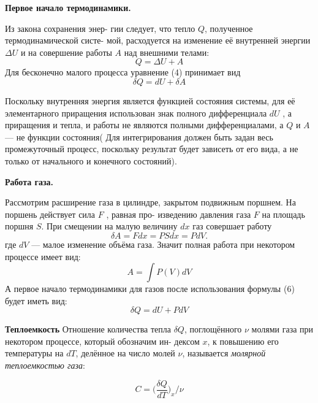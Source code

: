 \documentclass[12pt]{article}
\begin{document}
    \textbf{ Первое начало термодинамики.}

    Из закона сохранения энер- гии следует, что тепло $Q$, полученное термодинамической систе- мой, расходуется на изменение её внутренней энергии $\Delta U$ и на совершение работы $A$ над внешними телами:
    \begin{equation}
        Q = \Delta U + A
    \end{equation}
    Для бесконечно малого процесса уравнение (4) принимает вид 
    \begin{equation}
        \delta Q = dU + \delta A
    \end{equation}

    Поскольку внутренняя энергия является функцией состояния системы, для её элементарного приращения использован знак полного дифференциала $dU$ , а приращения и тепла, и работы не являются полными дифференциалами, а $Q$ и $A$ — не функции состояния(
    Для интегрирования должен быть задан весь промежуточный процесс, поскольку результат будет зависеть от его вида, а не только от начального и конечного состояний).

    \textbf{ Работа газа.}

    Рассмотрим расширение газа в цилиндре, закрытом подвижным поршнем. На поршень действует сила $F$ , равная про- изведению давления газа $F$ на площадь поршня $S$. При смещении на малую величину $dx$ газ совершает работу
    \begin{equation}
        \delta A = F dx = P S dx = P dV.
    \end{equation}
    где $dV$  — малое изменение объёма газа.
    Значит полная работа при некотором процессе имеет вид:
    \begin{equation}
        A = \int P(V) dV
    \end{equation}
    А первое начало термодинамики для газов после использования формулы (6) будет иметь вид:
    \begin{equation}
        \delta Q = dU + P dV
    \end{equation}

    \textbf{Теплоемкость}
    Отношение количества тепла $\delta Q$, поглощённого $\nu$ молями газа при некотором процессе, который обозначим ин- дексом $x$, к повышению его температуры на $dT$, делённое на число молей $\nu$, называется \textit{молярной теплоемкостью газа}:

    \begin{equation}
        C = \bigg(\frac{\delta Q}{dT}\bigg)_x / \nu
    \end{equation}
\end{document}
